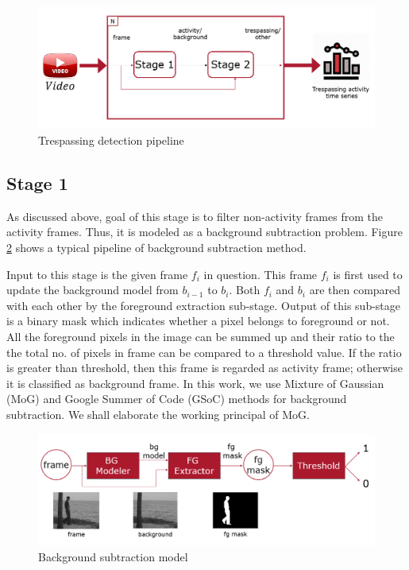 \begin{figure}
    \centering
    \includegraphics[width=\linewidth]{images/trespassing-detection-pipeline.PNG}
    \caption{Trespassing detection pipeline}
    \label{fig:trespassing-detection-pipeline}
\end{figure}

\subsection{Stage 1}
As discussed above, goal of this stage is to filter non-activity frames from the activity frames. Thus, it is modeled as a background subtraction problem. Figure \ref{fig:background-subtraction-model} shows a typical pipeline of background subtraction method. 

Input to this stage is the given frame $f_i$ in question. This frame $f_i$ is first used to update the background model from $b_{i-1}$ to $b_i$. Both $f_i$ and $b_i$ are then compared with each other by the foreground extraction sub-stage. Output of this sub-stage is a binary mask which indicates whether a pixel belongs to foreground or not. All the foreground pixels in the image can be summed up and their ratio to the the total no. of pixels in frame can be compared to a threshold value. If the ratio is greater than threshold, then this frame is regarded as activity frame; otherwise it is classified as background frame. In this work, we use Mixture of Gaussian (MoG) and Google Summer of Code (GSoC) methods for background subtraction. We shall elaborate the working principal of MoG. 
\begin{figure}
    \centering
    \includegraphics[width=\linewidth]{images/background-subtraction-model.PNG}
    \caption{Background subtraction model}
    \label{fig:background-subtraction-model}
\end{figure}

